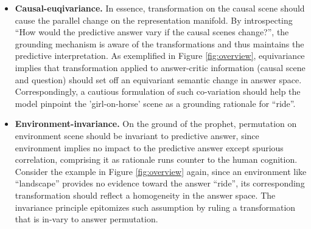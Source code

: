 \begin{itemize}[leftmargin=*]
    \item \textbf{Causal-euqivariance.} 
    In essence, transformation on the causal scene should cause the parallel change on the representation manifold. By introspecting ``How would the predictive answer vary if the causal scenes change?'', the grounding mechanism is aware of the transformations and thus maintains the predictive interpretation.
    As exemplified in Figure \ref{fig:overview}, equivariance implies that transformation applied to answer-critic information (\ie causal scene and question) should set off an equivariant semantic change in answer space.
    Correspondingly, a cautious formulation of such co-variation should help the model pinpoint the 'girl-on-horse' scene as a grounding rationale for ``ride''.
    
    \item \textbf{Environment-invariance.} 
    On the ground of the prophet, permutation on environment scene should be invariant to predictive answer, since environment implies no impact to the predictive answer except spurious correlation, comprising it as rationale runs counter to the human cognition. 
    Consider the example in Figure \ref{fig:overview} again, since an environment like ``landscape'' provides no evidence toward the answer ``ride'', its corresponding transformation should reflect a homogeneity in the answer space. The invariance principle epitomizes such assumption by ruling a transformation that is in-vary to answer permutation.
\end{itemize}



